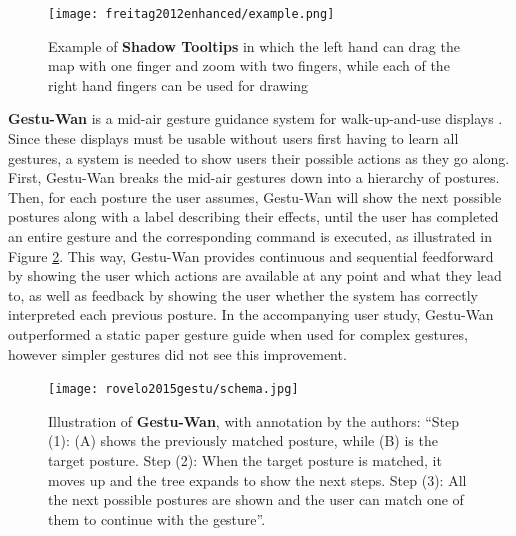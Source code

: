 \begin{figure}
    \centering
    \texttt{[image: freitag2012enhanced/example.png]}
    \caption{Example of \textbf{Shadow Tooltips} in which the left hand can drag the map with one finger and zoom with two fingers, while each of the right hand fingers can be used for drawing \cite{freitag2012enhanced}}
    \label{fig:freitag2012enhanced_demo}
\end{figure}

\textbf{Gestu-Wan} is a mid-air gesture guidance system for walk-up-and-use displays \cite{rovelo2015gestu}. Since these displays must be usable without users first having to learn all gestures, a system is needed to show users their possible actions as they go along. First, Gestu-Wan breaks the mid-air gestures down into a hierarchy of postures. Then, for each posture the user assumes, Gestu-Wan will show the next possible postures along with a label describing their effects, until the user has completed an entire gesture and the corresponding command is executed, as illustrated in Figure \ref{fig:rovelo2015gestu_schema}. This way, Gestu-Wan provides continuous and sequential feedforward by showing the user which actions are available at any point and what they lead to, as well as feedback by showing the user whether the system has correctly interpreted each previous posture. In the accompanying user study, Gestu-Wan outperformed a static paper gesture guide when used for complex gestures, however simpler gestures did not see this improvement.

\begin{figure}
    \centering
    \texttt{[image: rovelo2015gestu/schema.jpg]}
    \caption{Illustration of \textbf{Gestu-Wan}, with annotation by the authors: ``Step (1): (A) shows the previously matched posture, while (B) is the target posture. Step (2): When the target posture is matched, it moves up and the tree expands to show the next steps. Step (3): All the next possible postures are shown and the user can match one of them to continue with the gesture''. \cite{freitag2012enhanced}}
    \label{fig:rovelo2015gestu_schema}
\end{figure}


